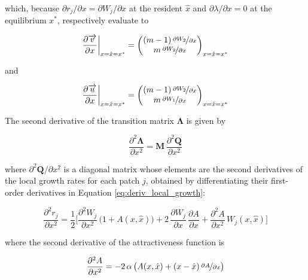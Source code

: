 which, because $\partial r_j / \partial x = \partial W_j / \partial x$ at the resident $\hat x$ and $\partial \lambda / \partial x = 0$ at the equilibrium $x^*$, respectively evaluate to

\begin{equation}
    \frac{\partial \overrightarrow{v}}{\partial x}\bigg|_{x=\hat x=x^*} = 
    \begin{pmatrix}
        (m-1)\,\nicefrac{\partial W_2}{\partial x}\\
        m\,\nicefrac{\partial W_2}{\partial x}
    \end{pmatrix}
    _{x=\hat x=x^*}
\end{equation}

and

\begin{equation}
    \frac{\partial \overrightarrow{u}}{\partial x}\bigg|_{x=\hat x=x^*} = 
    \begin{pmatrix}
        (m-1)\,\nicefrac{\partial W_2}{\partial x}\\
        m\,\nicefrac{\partial W_1}{\partial x}
    \end{pmatrix}
    _{x=\hat x=x^*}
    \label{eq:right_eigenvector_equilibrium}
\end{equation}

The second derivative of the transition matrix $\pmb \Lambda$ is given by 

\begin{equation}
    \frac{\partial^2 \pmb{\Lambda}}{\partial x^2} = \pmb{M} \, \frac{\partial^2 \pmb{Q}}{\partial x^2}
    \label{eq:second_derivative_transition}
\end{equation}

where $\partial^2 \pmb{Q} / \partial x^2$ is a diagonal matrix whose elements are the second derivatives of the local growth rates for each patch $j$, obtained by differentiating their first-order derivatives in Equation \ref{eq:deriv_local_growth}:

\begin{equation}
    \frac{\partial^2 r_j}{\partial x^2} = \frac{1}{2} \bigg[\frac{\partial^2 W_j}{\partial x^2}\,\big(1+A(x,\hat{x})\big) + 2\,\frac{\partial W_j}{\partial x}\,\frac{\partial A}{\partial x} + \frac{\partial^2 A}{\partial x^2}\,W_j(x,\hat{x})\bigg]
\end{equation}

where the second derivative of the attractiveness function is

\begin{equation}
    \frac{\partial^2 A}{\partial x^2} = -2\,\alpha\,\big( A(x,\hat{x}) + (x-\hat{x})\,\nicefrac{\partial A}{\partial x} \big)
\end{equation}

